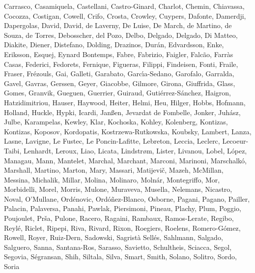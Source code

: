 \documentclass[onecolumn]{aa}
\begin{document}
\begin{thebibliography}{149}
{		{Carrasco}, {Casamiquela}, {Castellani}, {Castro-Ginard}, {Charlot},
		{Chemin}, {Chiavassa}, {Cocozza}, {Costigan}, {Cowell}, {Crifo}, {Crosta},
		{Crowley}, {Cuypers}, {Dafonte}, {Damerdji}, {Dapergolas}, {David}, {David},
		{de Laverny}, {De Luise}, {De March}, {de Martino}, {de Souza}, {de Torres},
		{Debosscher}, {del Pozo}, {Delbo}, {Delgado}, {Delgado}, {Di Matteo},
		{Diakite}, {Diener}, {Distefano}, {Dolding}, {Drazinos}, {Dur{\'a}n},
		{Edvardsson}, {Enke}, {Eriksson}, {Esquej}, {Eynard Bontemps}, {Fabre},
		{Fabrizio}, {Faigler}, {Falc{\~a}o}, {Farr{\`a}s Casas}, {Federici},
		{Fedorets}, {Fernique}, {Figueras}, {Filippi}, {Findeisen}, {Fonti},
		{Fraile}, {Fraser}, {Fr{\'e}zouls}, {Gai}, {Galleti}, {Garabato},
		{Garc{\'\i}a-Sedano}, {Garofalo}, {Garralda}, {Gavel}, {Gavras}, {Gerssen},
		{Geyer}, {Giacobbe}, {Gilmore}, {Girona}, {Giuffrida}, {Glass}, {Gomes},
		{Granvik}, {Gueguen}, {Guerrier}, {Guiraud}, {Guti{\'e}rrez-S{\'a}nchez},
		{Haigron}, {Hatzidimitriou}, {Hauser}, {Haywood}, {Heiter}, {Helmi}, {Heu},
		{Hilger}, {Hobbs}, {Hofmann}, {Holland}, {Huckle}, {Hypki}, {Icardi},
		{Jan{\ss}en}, {Jevardat de Fombelle}, {Jonker}, {Juh{\'a}sz}, {Julbe},
		{Karampelas}, {Kewley}, {Klar}, {Kochoska}, {Kohley}, {Kolenberg},
		{Kontizas}, {Kontizas}, {Koposov}, {Kordopatis}, {Kostrzewa-Rutkowska},
		{Koubsky}, {Lambert}, {Lanza}, {Lasne}, {Lavigne}, {Le Fustec}, {Le
			Poncin-Lafitte}, {Lebreton}, {Leccia}, {Leclerc}, {Lecoeur-Taibi},
		{Lenhardt}, {Leroux}, {Liao}, {Licata}, {Lindstr{\o}m}, {Lister}, {Livanou},
		{Lobel}, {L{\'o}pez}, {Managau}, {Mann}, {Mantelet}, {Marchal}, {Marchant},
		{Marconi}, {Marinoni}, {Marschalk{\'o}}, {Marshall}, {Martino}, {Marton},
		{Mary}, {Massari}, {Matijevi{\v{c}}}, {Mazeh}, {McMillan}, {Messina},
		{Michalik}, {Millar}, {Molina}, {Molinaro}, {Moln{\'a}r}, {Montegriffo},
		{Mor}, {Morbidelli}, {Morel}, {Morris}, {Mulone}, {Muraveva}, {Musella},
		{Nelemans}, {Nicastro}, {Noval}, {O'Mullane}, {Ord{\'e}novic},
		{Ord{\'o}{\~n}ez-Blanco}, {Osborne}, {Pagani}, {Pagano}, {Pailler},
		{Palacin}, {Palaversa}, {Panahi}, {Pawlak}, {Piersimoni}, {Pineau}, {Plachy},
		{Plum}, {Poggio}, {Poujoulet}, {Pr{\v{s}}a}, {Pulone}, {Racero}, {Ragaini},
		{Rambaux}, {Ramos-Lerate}, {Regibo}, {Reyl{\'e}}, {Riclet}, {Ripepi}, {Riva},
		{Rivard}, {Rixon}, {Roegiers}, {Roelens}, {Romero-G{\'o}mez}, {Rowell},
		{Royer}, {Ruiz-Dern}, {Sadowski}, {Sagrist{\`a} Sell{\'e}s}, {Sahlmann},
		{Salgado}, {Salguero}, {Sanna}, {Santana-Ros}, {Sarasso}, {Savietto},
		{Schultheis}, {Sciacca}, {Segol}, {Segovia}, {S{\'e}gransan}, {Shih},
		{Siltala}, {Silva}, {Smart}, {Smith}, {Solano}, {Solitro}, {Sordo}, {Soria
}}
\end{thebibliography}
\end{document}
